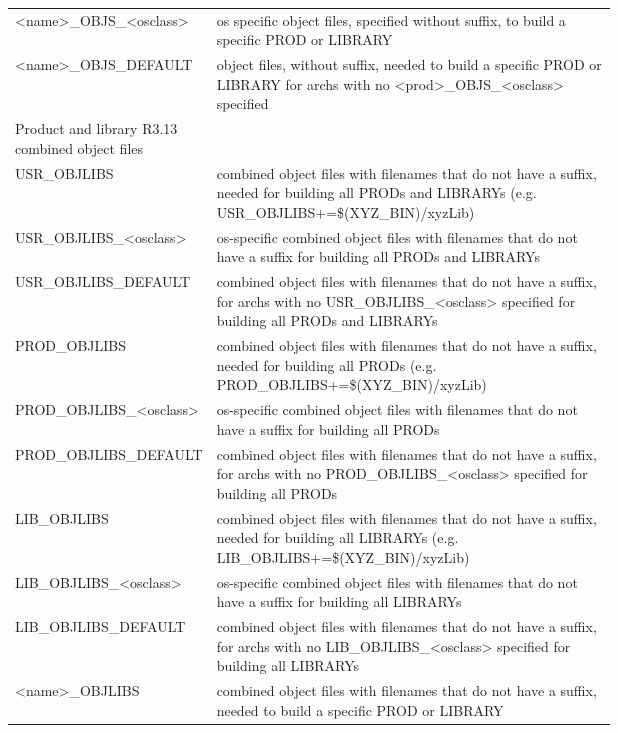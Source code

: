 \begin{center}
\begin{longtable}{lp{0.7\linewidth}}
\textless{}name\textgreater{}\_OBJS\_\textless{}osclass\textgreater{} & os specific object files, specified without suffix, to build a specific PROD or LI\textbar{}BRARY\\
\textless{}name\textgreater{}\_OBJS\_DEFAULT & object files, without suffix, needed to build a specific PROD or LIBRARY for archs with no \textless{}prod\textgreater{}\_OBJS\_\textless{}osclass\textgreater{} specified\\
Product and library R3.13 combined object files & \\
USR\_OBJLIBS & combined object files with filenames that do not have a suffix, needed for building all PRODs and LIBRARYs (e.g. USR\_OBJLIBS+=\$(XYZ\_BIN)/xyzLib)\\
USR\_OBJLIBS\_\textless{}osclass\textgreater{} & os-specific combined object files with filenames that do not have a suffix for building all PRODs and LIBRARYs\\
USR\_OBJLIBS\_DEFAULT & combined object files with filenames that do not have a suffix, for archs with no USR\_OBJLIBS\_\textless{}osclass\textgreater{} specified for building all PRODs and LIBRARYs\\
PROD\_OBJLIBS & combined object files with filenames that do not have a suffix, needed for building all PRODs (e.g. PROD\_OBJLIBS+=\$(XYZ\_BIN)/xyzLib)\\
PROD\_OBJLIBS\_\textless{}osclass\textgreater{} & os-specific combined object files with filenames that do not have a suffix for building all PRODs\\
PROD\_OBJLIBS\_DEFAULT & combined object files with filenames that do not have a suffix, for archs with no PROD\_OBJLIBS\_\textless{}osclass\textgreater{} specified for building all PRODs\\
LIB\_OBJLIBS & combined object files with filenames that do not have a suffix, needed for building all LIBRARYs (e.g. LIB\_OBJLIBS+=\$(XYZ\_BIN)/xyzLib)\\
LIB\_OBJLIBS\_\textless{}osclass\textgreater{} & os-specific combined object files with filenames that do not have a suffix for building all LIBRARYs\\
LIB\_OBJLIBS\_DEFAULT & combined object files with filenames that do not have a suffix, for archs with no LIB\_OBJLIBS\_\textless{}osclass\textgreater{} specified for building all LIBRARYs\\
\textless{}name\textgreater{}\_OBJLIBS & combined object files with filenames that do not have a suffix, needed to build a specific PROD or LIBRARY\\

\end{longtable}
\end{center}

